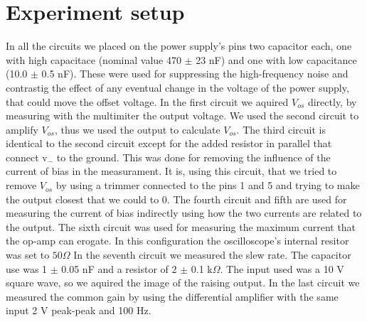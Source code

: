 \section{Experiment setup}
In all the circuits we placed on the power supply's pins two capacitor each, one with high capacitace (nominal value 470 $\pm$ 23 nF) and one with low capacitance (10.0 $\pm$ 0.5 nF). These were used for suppressing the high-frequency noise and contrastig the effect of any eventual change in the voltage of the power supply, that could move the offset voltage.
In the first circuit we aquired $V_{os}$ directly, by measuring with the multimiter the output voltage.
We used the second circuit to amplify $V_{os}$, thus we used the output to calculate $V_{os}$.
The third circuit is identical to  the second circuit except for the added resistor in parallel that connect v$_-$ to the ground. This was done for removing the influence of the current of bias in the measurament. It is, using this circuit, that we tried to remove $V_{os}$ by using a trimmer connected to the pins 1 and 5 and trying to make the output closest that we could to 0.
The fourth circuit and fifth are used for measuring the current of bias indirectly using how the two currents are related to the output.
The sixth circuit was used for measuring the maximum current that the op-amp can erogate. In this configuration the oscilloscope's internal resitor was set to $50 \Omega$
In the seventh circuit we measured the slew rate. The capacitor use was 1 $\pm$ 0.05 nF and a resistor of 2 $\pm$ 0.1 k$\Omega$. The input used was a 10 V  square wave, so we aquired the image of the raising output.
In the last circuit we measured the common gain by using the differential amplifier with the same input 2 V peak-peak and 100 Hz.

